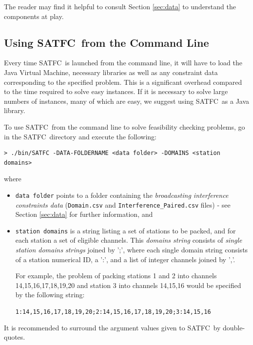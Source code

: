 \documentclass[
10pt, %
letterpaper, %
oneside, %
headinclude,footinclude, %
BCOR5mm, %
needspace, %
]{scrartcl}
\newcommand{\SATFC}{\textsc{SATFC}~}
\begin{document}
The reader may find it helpful to consult Section \ref{sec:data} to understand the components at play.

\subsection{Using \SATFC from the Command Line}\label{sec:standalone}

\begin{fwarning}
    Every time \SATFC is launched from the command line, it will have to load the Java Virtual Machine, necessary libraries as well as any constraint data corresponding to the specified problem. This is a significant overhead compared to the time required to solve easy instances. If it is necessary to solve large numbers of instances, many of which are easy, we suggest using \SATFC as a Java library.
\end{fwarning}

To use \SATFC from the command line to solve feasibility checking problems, go in the \SATFC directory and execute the following:
\begin{lstlisting}[style=Bash]
> ./bin/SATFC -DATA-FOLDERNAME <data folder> -DOMAINS <station domains>
\end{lstlisting}
where
\begin{itemize}
    \item \texttt{data folder} points to a folder containing the \emph{broadcasting interference constraints data} (\texttt{Domain.csv} and \texttt{Interference\_Paired.csv} files) - see Section \ref{sec:data} for further information, and
    \item \texttt{station domains} is a string listing a set of stations to be packed, and for each station a set of eligible channels. This \emph{domains string} consists of \emph{single station domains strings} joined by ';', where each single domain string consists of a station numerical ID, a ':', and a list of integer channels joined by ','.

    For example, the problem of packing stations 1 and 2 into channels 14,15,16,17,18,19,20 and station 3 into channels 14,15,16 would be specified by the following string:
    \begin{center}
        \texttt{1:14,15,16,17,18,19,20;2:14,15,16,17,18,19,20;3:14,15,16}
    \end{center}
\end{itemize}
It is recommended to surround the argument values given to \SATFC by double-quotes.
\end{document}
